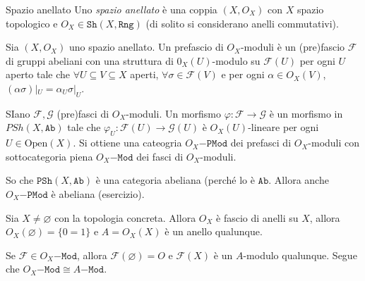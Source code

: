 \begin{definition}{Spazio anellato}
    Uno \emph{spazio anellato} è una coppia \({(X, O_X)}\) con \(X\) spazio
    topologico e \(O_X \in \mathtt{Sh}{(X, \mathtt{Rng})}\) (di solito si
    considerano anelli commutativi).
\end{definition}

\begin{definition}{}
    Sia \({(X, O_X)}\) uno spazio anellato. Un prefascio di \(O_X\)-moduli è un
    (pre)fascio \(\mathcal{F}\) di gruppi abeliani con una struttura di
    \(0_X{(U)}\)-modulo su \(\mathcal{F}{(U)}\) per ogni \(U\) aperto tale che
    \(\forall  U \subseteq V \subseteq X  \) aperti, \(\forall \sigma \in
    \mathcal{F}{(V)}\) e per ogni \(\alpha \in O_X{(V)} \), \((\alpha
    \sigma)|_{U}  = \alpha_U \sigma|_U\).
\end{definition}

SIano \(\mathcal{F}, \mathcal{G}\) (pre)fasci di \(O_X\)-moduli. Un morfismo
\(\varphi  : \mathcal{F} \to \mathcal{G}\) è un morfismo in \(PSh{(X,
\mathtt{Ab})}\) tale che \(\varphi _U : \mathcal{F}{(U)} \to \mathcal{G}{(U)}\)
è \(O_X{(U)}\)-lineare per ogni \(U \in \mathrm{Open}{(X)}\). Si ottiene una
cateogria \(O_X\mathtt{-PMod}\) dei prefasci di \(O_X\)-moduli con
sottocategoria piena \(O_X\mathtt{-Mod}\) dei fasci di \(O_X\)-moduli.

\begin{remark}{}
    So che \(\mathtt{PSh}{(X, \mathtt{Ab})}\) è una categoria abeliana (perché
    lo è \(\mathtt{Ab}\). Allora anche \(O_X\mathtt{-PMod}\) è abeliana
    (esercizio). 
\end{remark}

\begin{example}{}
    Sia \(X \neq \varnothing\) con la topologia concreta. Allora \(O_X\) è fascio
    di anelli su \(X\), allora \(O_X{(\varnothing)} = \{0=1\} \) e \(A =
    O_X{(X)}\) è un anello qualunque.
\end{example}

Se \(\mathcal{F} \in O_X\mathtt{-Mod}\), allora \(\mathcal{F}{(\varnothing)} =
O\) e \(\mathcal{F}{(X)}\) è un \(A\)-modulo qualunque. Segue che
\(O_X\mathtt{-Mod} \cong A\mathtt{-Mod}\). 

